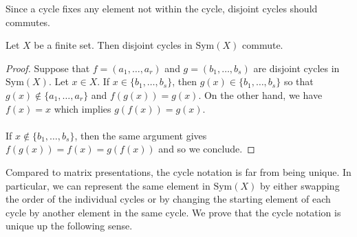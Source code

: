 \documentclass[a4paper]{article}
\begin{document}
Since a cycle fixes any element not within the cycle, disjoint cycles should commutes. 

\begin{prp}{}{} Let $X$ be a finite set. Then disjoint cycles in $\text{Sym}(X)$ commute. \tcbline
\begin{proof}
Suppose that $f=(a_1,\dots,a_r)$ and $g=(b_1,\dots,b_s)$ are disjoint cycles in $\text{Sym}(X)$. Let $x\in X$. If $x\in\{b_1,\dots,b_s\}$, then $g(x)\in\{b_1,\dots,b_s\}$ so that $g(x)\notin\{a_1,\dots,a_r\}$ and $f(g(x))=g(x)$. On the other hand, we have $f(x)=x$ which implies $g(f(x))=g(x)$. \\~\\

If $x\notin\{b_1,\dots,b_s\}$, then the same argument gives $f(g(x))=f(x)=g(f(x))$ and so we conclude. 
\end{proof}
\end{prp}

Compared to matrix presentations, the cycle notation is far from being unique. In particular, we can represent the same element in $\text{Sym}(X)$ by either swapping the order of the individual cycles or by changing the starting element of each cycle by another element in the same cycle. We prove that the cycle notation is unique up the following sense. \\~\\
\end{document}
